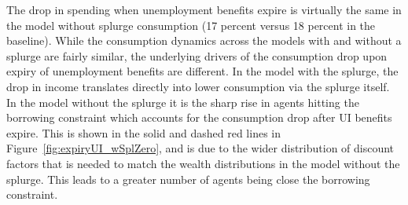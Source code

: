 The drop in spending when unemployment benefits expire is virtually the same in the model without splurge consumption (17 percent versus 18 percent in the baseline).
While the consumption dynamics across the models with and without a splurge are fairly similar, the underlying drivers of the consumption drop upon expiry of unemployment benefits are different.
In the model with the splurge, the drop in income translates directly into lower consumption via the splurge itself.
In the model without the splurge it is the sharp rise in agents hitting the borrowing constraint which accounts for the consumption drop after UI benefits expire.
This is shown in the solid and dashed red lines in Figure~\ref{fig:expiryUI_wSplZero}, and is due to the wider distribution of discount factors that is needed to match the wealth distributions in the model without the splurge.
This leads to a greater number of agents being close the borrowing constraint.

